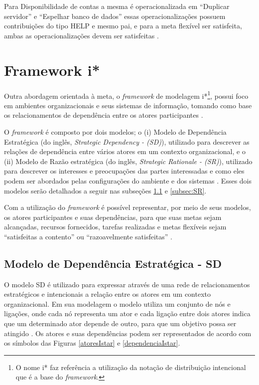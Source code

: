 Para Disponibilidade de contas a mesma é operacionalizada em “Duplicar servidor” e “Espelhar banco de dados” essas operacionalizações possuem contribuições do tipo HELP e mesmo pai, e para a meta flexível ser satisfeita, ambas as operacionalizações devem ser satisfeitas \cite{affleck2012supporting}. 


\section{Framework i*}
\label{sec:i*}


Outra abordagem orientada à meta, o \textit{framework} de modelagem i*\footnote[1]{O nome i* faz referência a utilização da notação de distribuição intencional que é a base do \textit{framework}.}, possui foco em ambientes organizacionais e seus sistemas de informação, tomando como base os relacionamentos de dependência entre os atores participantes \cite{yu1997towards} \cite{istarwiki20}. 

O \textit{framework} é composto por dois modelos; o (i) Modelo de Dependência Estratégica (do inglês, \textit{Strategic Dependency - (SD)}), utilizado para descrever as relações de dependência entre vários atores em um contexto organizacional, e o (ii) Modelo de Razão estratégica (do inglês, \textit{Strategic Rationale - (SR)}), utilizado para descrever os interesses e preocupações das partes interessadas e como eles podem ser abordados pelas configurações do ambiente e dos sistemas \cite{yu1997towards}. Esses dois modelos serão detalhados a seguir nas subseções \ref{subsec:SD} e \ref{subsec:SR}.

Com a utilização do \textit{framework} é possível representar, por meio de seus modelos, os atores participantes e suas dependências, para que suas metas sejam alcançadas, recursos fornecidos, tarefas realizadas e metas flexíveis sejam “satisfeitas a contento” ou “razoavelmente satisfeitas” \cite{istarwiki20}.
 
 
\subsection{Modelo de Dependência Estratégica - SD}
\label{subsec:SD}

O modelo SD é utilizado para expressar através de uma rede de relacionamentos estratégicos e intencionais a relação entre os atores em um contexto organizacional. Em sua modelagem o modelo utiliza um conjunto de nós e ligações, onde cada nó representa um ator e cada ligação entre dois atores indica que um determinado ator depende de outro, para que um objetivo possa ser atingido \cite{istarwiki20}. Os atores e suas dependências podem ser representados de acordo com os símbolos das Figuras  \ref{atoresIstar} e \ref{dependenciaIstar}.

